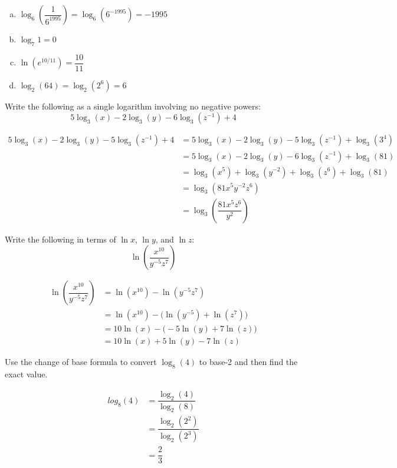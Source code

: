 \documentclass[12pt,letterpaper]{exam}
\begin{document}
\begin{questions}
\begin{enumerate}[(a)]
\item $\log_6 \left( \dfrac{1}{6^{1995}} \right)= \log_6(6^{-1995})= -1995$ \vfill

\item $\log_7 1= 0$ \vfill

\item $\ln(e^{10/11})= \dfrac{10}{11}$ \vfill

\item $\log_2(64)= \log_2(2^6)= 6$ \vfill
\end{enumerate}



\newpage
\question[10] Write the following as a single logarithm involving no negative powers:
	\[
	5 \log_3(x) - 2 \log_3(y) - 6 \log_3(z^{-1}) + 4
	\] \pvspace{1.5cm}
	
	\[
	\begin{aligned}
	5 \log_3(x) - 2 \log_3(y) - 5 \log_3(z^{-1}) + 4&= 5 \log_3(x) - 2 \log_3(y) - 5 \log_3(z^{-1}) + \log_3(3^4) \\[0.5cm]
	&= 5 \log_3(x) - 2 \log_3(y) - 6 \log_3(z^{-1}) + \log_3(81) \\[0.5cm]
	&= \log_3(x^5) + \log_3(y^{-2}) + \log_3(z^6) + \log_3(81) \\[0.5cm]
	&= \log_3(81 x^5 y^{-2} z^6) \\[0.5cm]
	&= \log_3 \left( \dfrac{81x^5 z^6}{y^2} \right)
	\end{aligned}
	\]



\newpage
\question[10] Write the following in terms of $\ln x$, $\ln y$, and $\ln z$:
	\[
	\ln \left( \dfrac{x^{10}}{y^{-5} z^7} \right)
	\] \pvspace{1.5cm}
	
	\[
	\begin{aligned}
	\ln \left( \dfrac{x^{10}}{y^{-5} z^7} \right)&= \ln(x^{10}) - \ln(y^{-5} z^7) \\[0.5cm]
	&=  \ln(x^{10}) - \bigg( \ln(y^{-5}) + \ln(z^7) \bigg) \\[0.5cm]
	&=  10 \ln(x) - \bigg( -5 \ln(y) + 7\ln(z) \bigg) \\[0.5cm]
	&=  10 \ln(x) + 5 \ln(y) - 7\ln(z)
	\end{aligned}
	\]



\newpage
\question[10] Use the change of base formula to convert $\log_8(4)$ to base-2 and then find the exact value. \pvspace{1.5cm}
	
	\[
	\begin{aligned}
	log_8(4)&= \dfrac{\log_2(4)}{\log_2(8)} \\[0.5cm]
	&= \dfrac{\log_2(2^2)}{\log_2(2^3)} \\[0.5cm]
	&= \dfrac{2}{3}
	\end{aligned}
	\]




\end{questions}
\end{document}
